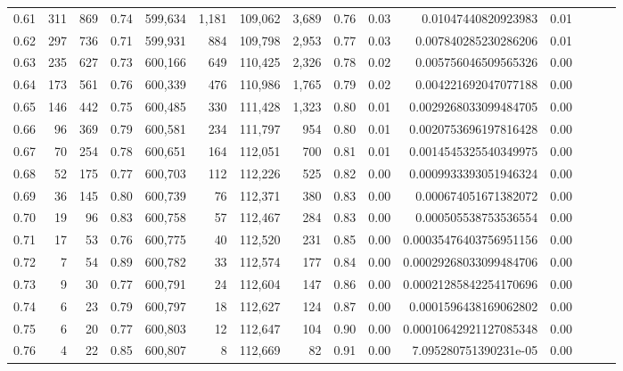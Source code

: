 \begin{tabular}{rrrrrrrrrrrrrrr}
0.61 &     311 &    869 &  0.74 &  599,634 &    1,181 &  109,062 &    3,689 &  0.76 &  0.03 &     0.01047440820923983 &      0.01 \\
0.62 &     297 &    736 &  0.71 &  599,931 &      884 &  109,798 &    2,953 &  0.77 &  0.03 &    0.007840285230286206 &      0.01 \\
0.63 &     235 &    627 &  0.73 &  600,166 &      649 &  110,425 &    2,326 &  0.78 &  0.02 &    0.005756046509565326 &      0.00 \\
0.64 &     173 &    561 &  0.76 &  600,339 &      476 &  110,986 &    1,765 &  0.79 &  0.02 &    0.004221692047077188 &      0.00 \\
0.65 &     146 &    442 &  0.75 &  600,485 &      330 &  111,428 &    1,323 &  0.80 &  0.01 &   0.0029268033099484705 &      0.00 \\
0.66 &      96 &    369 &  0.79 &  600,581 &      234 &  111,797 &      954 &  0.80 &  0.01 &   0.0020753696197816428 &      0.00 \\
0.67 &      70 &    254 &  0.78 &  600,651 &      164 &  112,051 &      700 &  0.81 &  0.01 &   0.0014545325540349975 &      0.00 \\
0.68 &      52 &    175 &  0.77 &  600,703 &      112 &  112,226 &      525 &  0.82 &  0.00 &   0.0009933393051946324 &      0.00 \\
0.69 &      36 &    145 &  0.80 &  600,739 &       76 &  112,371 &      380 &  0.83 &  0.00 &    0.000674051671382072 &      0.00 \\
0.70 &      19 &     96 &  0.83 &  600,758 &       57 &  112,467 &      284 &  0.83 &  0.00 &    0.000505538753536554 &      0.00 \\
0.71 &      17 &     53 &  0.76 &  600,775 &       40 &  112,520 &      231 &  0.85 &  0.00 &  0.00035476403756951156 &      0.00 \\
0.72 &       7 &     54 &  0.89 &  600,782 &       33 &  112,574 &      177 &  0.84 &  0.00 &  0.00029268033099484706 &      0.00 \\
0.73 &       9 &     30 &  0.77 &  600,791 &       24 &  112,604 &      147 &  0.86 &  0.00 &  0.00021285842254170696 &      0.00 \\
0.74 &       6 &     23 &  0.79 &  600,797 &       18 &  112,627 &      124 &  0.87 &  0.00 &   0.0001596438169062802 &      0.00 \\
0.75 &       6 &     20 &  0.77 &  600,803 &       12 &  112,647 &      104 &  0.90 &  0.00 &  0.00010642921127085348 &      0.00 \\
0.76 &       4 &     22 &  0.85 &  600,807 &        8 &  112,669 &       82 &  0.91 &  0.00 &   7.095280751390231e-05 &      0.00 \\

\end{tabular}
